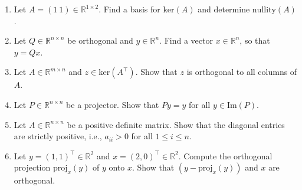 \vspace*{-0.5cm}
\begin{enumerate}
	\item Let $A = (1 ~1) \in \mathbb{R}^{1 \times 2}$. Find a basis for $\text{ker}(A) $ and determine $\text{nullity}(A)$.
	\item Let $Q \in \mathbb{R}^{n \times n}$ be orthogonal and $y \in\mathbb{R}^{n}$. Find a vector $x \in\mathbb{R}^{n}$, so that $y = Qx$.
		\item Let $A \in \mathbb{R}^{m \times n}$ and  $z \in \text{ker}(A^\top)$. Show that $z$ is orthogonal to all columns of $A$.
		\item Let $P\in\mathbb{R}^{n\times n}$ be a projector. Show that $Py = y$ for all $y \in \text{Im}(P)$.
		\item  Let $A \in \mathbb{R}^{n \times n}$ be a positive definite matrix. Show that the diagonal entries are strictly positive, i.e.,  $a_{ii} > 0$ for all $1\leq i\leq n$.
		\item Let  $y=(1,1)^\top \in \mathbb{R}^{2}$ and $x=(2,0)^\top\in \mathbb{R}^{2}$. Compute the orthogonal projection $\text{proj}_x(y) $ of $y$ onto $x$. Show that $(y - \text{proj}_x(y))$ and $x$ are orthogonal.
\end{enumerate}
 